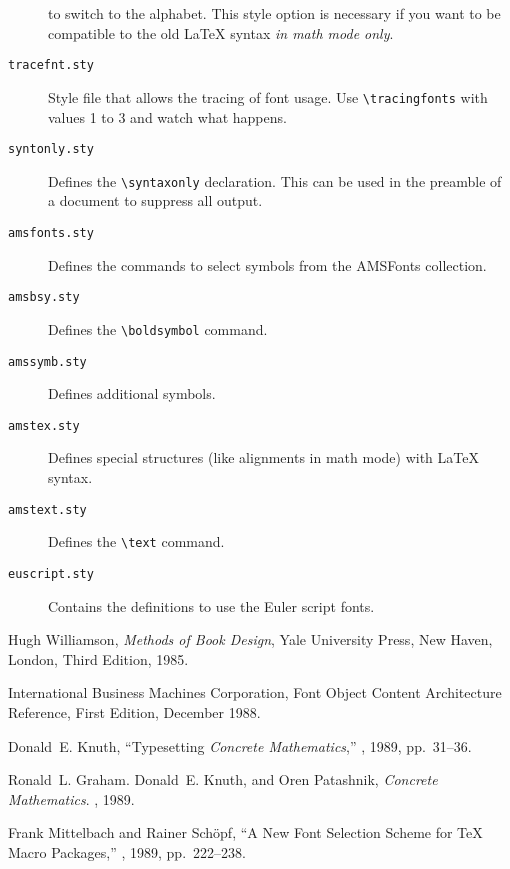\begin{description}
    to switch to the
   alphabet.  This style option is necessary if you want to be
   compatible to the old \LaTeX{} syntax {\em in math mode only}.
  \item[\tt tracefnt.sty]
   Style file that allows the tracing of font usage.
   Use \verb=\tracingfonts= with values 1 to 3 and watch
   what happens.
  \item[\tt syntonly.sty]
   Defines the \verb+\syntaxonly+ declaration.  This can be used
   in the preamble of a document to suppress all output.
  \item[\tt amsfonts.sty]
   Defines the commands to select symbols from the AMSFonts
   collection.
  \item[\tt amsbsy.sty]
   Defines the \verb+\boldsymbol+ command.
  \item[\tt amssymb.sty]
   Defines additional \AmSTeX{} symbols.
  \item[\tt amstex.sty]
   Defines special \AmSTeX{} structures (like alignments in math mode)
   with \LaTeX{} syntax.
  \item[\tt amstext.sty]
   Defines the \AmSTeX{} \verb+\text+ command.
  \item[\tt euscript.sty]
   Contains the definitions to use the Euler script fonts.
 \end{description}
 
 \begin{thebibliography}{9}
 \raggedright
  Hugh Williamson,
      {\sl Methods of Book Design},\newblock
      Yale University Press,
      New Haven, London,\newblock
      Third Edition, 1985.
 
  International Business Machines Corporation,\newblock
      Font Object Content Architecture Reference,\newblock
      First Edition, December 1988.
 
  Donald~E. Knuth, ``Typesetting {\sl Concrete
      Mathematics},'' , 1989, pp.~31--36.
 
  Ronald~L. Graham. Donald~E. Knuth, and
      Oren Patashnik, {\sl Concrete Mathematics}.  \AW, 1989.
 
  Frank Mittelbach and Rainer Sch\"opf,
      ``A New Font Selection Scheme for \TeX{} Macro Packages,''
      , 1989, pp.~222--238.
 
 \end{thebibliography}
 
